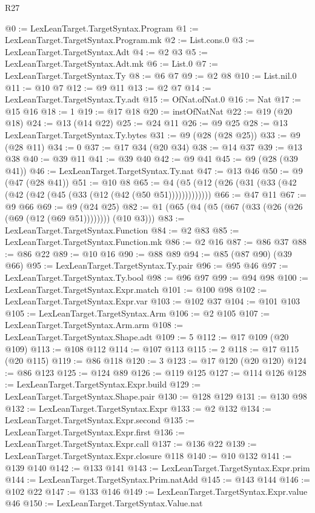 \begin{lexlean}{R27}
\begin{coremodule}
@0 := LexLeanTarget.TargetSyntax.Program
@1 := LexLeanTarget.TargetSyntax.Program.mk
@2 := List.cons.{0}
@3 := LexLeanTarget.TargetSyntax.Adt
@4 := @2 @3
@5 := LexLeanTarget.TargetSyntax.Adt.mk
@6 := List.{0}
@7 := LexLeanTarget.TargetSyntax.Ty
@8 := @6 @7
@9 := @2 @8
@10 := List.nil.{0}
@11 := @10 @7
@12 := @9 @11
@13 := @2 @7
@14 := LexLeanTarget.TargetSyntax.Ty.adt
@15 := OfNat.ofNat.{0}
@16 := Nat
@17 := @15 @16
@18 := 1
@19 := @17 @18
@20 := instOfNatNat
@22 := @19 (@20 @18)
@24 := @13 (@14 @22)
@25 := @24 @11
@26 := @9 @25
@28 := @13 LexLeanTarget.TargetSyntax.Ty.bytes
@31 := @9 (@28 (@28 @25))
@33 := @9 (@28 @11)
@34 := 0
@37 := @17 @34 (@20 @34)
@38 := @14 @37
@39 := @13 @38
@40 := @39 @11
@41 := @39 @40
@42 := @9 @41
@45 := @9 (@28 (@39 @41))
@46 := LexLeanTarget.TargetSyntax.Ty.nat
@47 := @13 @46
@50 := @9 (@47 (@28 @41))
@51 := @10 @8
@65 := @4 (@5 (@12 (@26 (@31 (@33 (@42 (@42 (@42 (@45 (@33 (@12 (@42 (@50 @51)))))))))))))
@66 := @47 @11
@67 := @9 @66
@69 := @9 (@24 @25)
@82 := @1 (@65 (@4 (@5 (@67 (@33 (@26 (@26 (@69 (@12 (@69 @51)))))))) (@10 @3)))
@83 := LexLeanTarget.TargetSyntax.Function
@84 := @2 @83
@85 := LexLeanTarget.TargetSyntax.Function.mk
@86 := @2 @16
@87 := @86 @37
@88 := @86 @22
@89 := @10 @16
@90 := @88 @89
@94 := @85 (@87 @90) (@39 @66)
@95 := LexLeanTarget.TargetSyntax.Ty.pair
@96 := @95 @46
@97 := LexLeanTarget.TargetSyntax.Ty.bool
@98 := @96 @97
@99 := @94 @98
@100 := LexLeanTarget.TargetSyntax.Expr.match
@101 := @100 @98
@102 := LexLeanTarget.TargetSyntax.Expr.var
@103 := @102 @37
@104 := @101 @103
@105 := LexLeanTarget.TargetSyntax.Arm
@106 := @2 @105
@107 := LexLeanTarget.TargetSyntax.Arm.arm
@108 := LexLeanTarget.TargetSyntax.Shape.adt
@109 := 5
@112 := @17 @109 (@20 @109)
@113 := @108 @112
@114 := @107 @113
@115 := 2
@118 := @17 @115 (@20 @115)
@119 := @86 @118
@120 := 3
@123 := @17 @120 (@20 @120)
@124 := @86 @123
@125 := @124 @89
@126 := @119 @125
@127 := @114 @126
@128 := LexLeanTarget.TargetSyntax.Expr.build
@129 := LexLeanTarget.TargetSyntax.Shape.pair
@130 := @128 @129
@131 := @130 @98
@132 := LexLeanTarget.TargetSyntax.Expr
@133 := @2 @132
@134 := LexLeanTarget.TargetSyntax.Expr.second
@135 := LexLeanTarget.TargetSyntax.Expr.first
@136 := LexLeanTarget.TargetSyntax.Expr.call
@137 := @136 @22
@139 := LexLeanTarget.TargetSyntax.Expr.closure @118
@140 := @10 @132
@141 := @139 @140
@142 := @133 @141
@143 := LexLeanTarget.TargetSyntax.Expr.prim
@144 := LexLeanTarget.TargetSyntax.Prim.natAdd
@145 := @143 @144
@146 := @102 @22
@147 := @133 @146
@149 := LexLeanTarget.TargetSyntax.Expr.value @46
@150 := LexLeanTarget.TargetSyntax.Value.nat

\end{coremodule}
\end{lexlean}
